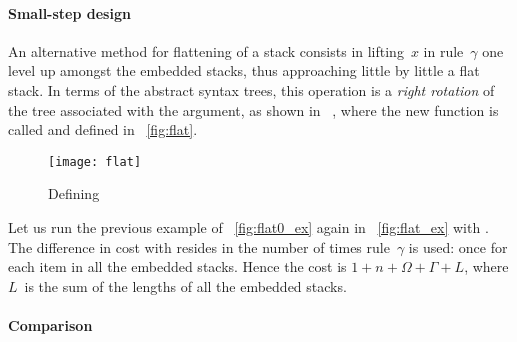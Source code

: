 \paragraph{Small-step design}

An alternative method for flattening of a stack consists in
lifting~\(x\) in rule~\(\gamma\) one level up amongst the embedded
stacks, thus approaching little by little a flat stack. In terms of
the abstract syntax trees, this operation is a \emph{right
  rotation} of the tree associated with
the argument, as shown in \figs~,
where the new function is called
 and defined in
\fig~\vref{fig:flat}.
%
\begin{figure}
\centering
\texttt{[image: flat]}%
\caption{Defining }
\label{fig:flat}
\end{figure}
Let us run the previous example of
\fig~\vref{fig:flat0_ex} again in \fig~\vref{fig:flat_ex} with
. The difference in cost with
 resides in the number
of times rule~\(\gamma\) is used: once for each item in all the
embedded stacks. Hence the
cost\label{cost:flat} is \(1 + n + \Omega
+ \Gamma + L\), where \(L\)~is the sum of the lengths of all the
embedded stacks.

\paragraph{Comparison}

